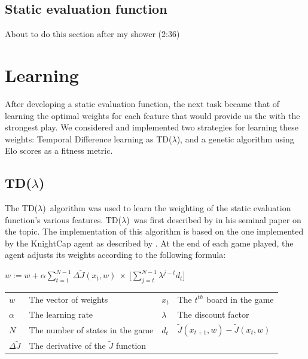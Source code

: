 \documentclass[11pt]{article}
\newcommand{\tdl}{TD($\lambda$)}
\begin{document}
\subsection{Static evaluation function}
\label{sub:eval_func}
About to do this section after my shower (2:36)
\section{Learning}
\label{sec:learning}

After developing a static evaluation function, the next task became that of
learning the optimal weights for each feature that would provide us the with
the strongest play. We considered and implemented two strategies for learning
these weights: Temporal Difference learning as \tdl, and a genetic algorithm
using Elo scores as a fitness metric.

\subsection{\tdl}
\label{sub:tdlambda}

The \tdl\ algorithm was used to learn the weighting of the static evaluation
function's various features. \tdl\ was first described by \citet{Sutton1988}
in his seminal paper on the topic. The implementation of this algorithm is
based on the one implemented by the KnightCap agent as described by
\citet{Baxter1997}.  At the end of each game played, the agent adjusts its
weights according to the following formula:

\begin{center}

    $\displaystyle w := w + \alpha \sum _{t=1} ^{N-1} \Delta \tilde{J}(x_t,w) \: \times \: \Big[ \sum ^ {N-1} _{j=t} \lambda^{j-t} d_t \Big] $\\
        
    \begin{tabular}{  l l | l l }
      $w$                   & The vector of weights                         &$x_t$  & The $t^{th}$ board in the game \\
      $\alpha$              & The learning rate                             &$\lambda$      &The discount factor \\
      $N$                   & The number of states in the game              &$d_t$          &$\tilde{J}(x_{t+1},w) - \tilde{J}(x_t,w)$\\
      $\Delta \tilde{J}$    & The derivative of the $\tilde{J}$ function    &               &\\
    \end{tabular}
\end{center}
\end{document}
